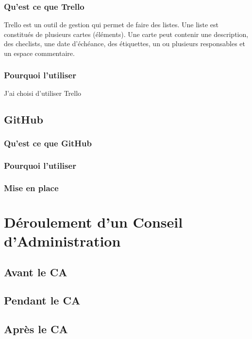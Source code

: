 \documentclass[12pt,a4paper]{report}
\begin{document}
      \subsubsection{Qu'est ce que Trello}
        Trello est un outil de gestion qui permet de faire des listes. Une liste est constitués de plusieurs cartes (éléments). Une carte peut contenir une description, des checlists, une date d'échéance, des étiquettes, un ou plusieurs responsables et un espace commentaire.

      \subsubsection{Pourquoi l'utiliser}
        J'ai choisi d'utiliser Trello

    \subsection{GitHub}
      \subsubsection{Qu'est ce que GitHub}
      \subsubsection{Pourquoi l'utiliser}
      \subsubsection{Mise en place}

  \section{Déroulement d'un Conseil d'Administration}
    \subsection{Avant le CA}
    \subsection{Pendant le CA}
    \subsection{Après le CA}
\end{document}
